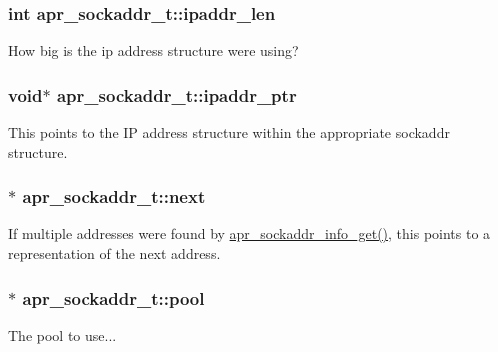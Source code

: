 \subsubsection[{\texorpdfstring{ipaddr\+\_\+len}{ipaddr_len}}]{\setlength{\rightskip}{0pt plus 5cm}int apr\+\_\+sockaddr\+\_\+t\+::ipaddr\+\_\+len}\hypertarget{structapr__sockaddr__t_a81be21b2eb968b83ca36183213c99867}{}\label{structapr__sockaddr__t_a81be21b2eb968b83ca36183213c99867}
How big is the ip address structure we\textquotesingle{}re using? 
\subsubsection[{\texorpdfstring{ipaddr\+\_\+ptr}{ipaddr_ptr}}]{\setlength{\rightskip}{0pt plus 5cm}void$\ast$ apr\+\_\+sockaddr\+\_\+t\+::ipaddr\+\_\+ptr}\hypertarget{structapr__sockaddr__t_a6e1b71121ada4047acde36c6777b5442}{}\label{structapr__sockaddr__t_a6e1b71121ada4047acde36c6777b5442}
This points to the IP address structure within the appropriate sockaddr structure. 
\subsubsection[{\texorpdfstring{next}{next}}]{$\ast$ apr\+\_\+sockaddr\+\_\+t\+::next}\hypertarget{structapr__sockaddr__t_a774835c6b8e3adf255b752e8b126c434}{}\label{structapr__sockaddr__t_a774835c6b8e3adf255b752e8b126c434}
If multiple addresses were found by \hyperlink{group__apr__network__io_gaa2f399ca2b60b35c0abf7630298c6c9f}{apr\+\_\+sockaddr\+\_\+info\+\_\+get()}, this points to a representation of the next address. 
\subsubsection[{\texorpdfstring{pool}{pool}}]{$\ast$ apr\+\_\+sockaddr\+\_\+t\+::pool}\hypertarget{structapr__sockaddr__t_a5f2d72a6a181cf2f54ba7c922aa0dfab}{}\label{structapr__sockaddr__t_a5f2d72a6a181cf2f54ba7c922aa0dfab}
The pool to use... 

